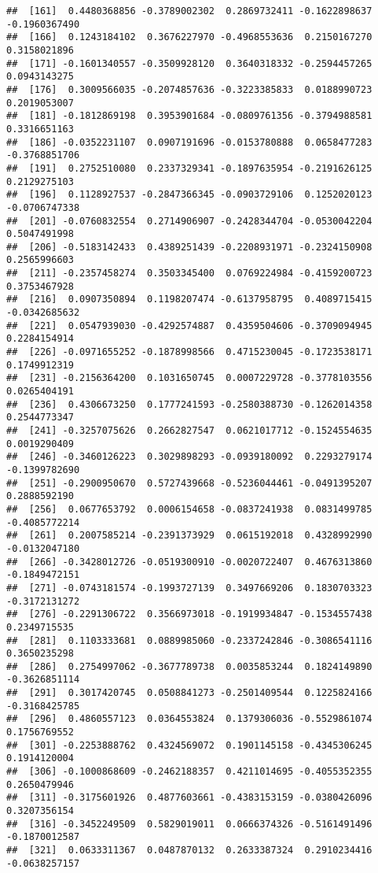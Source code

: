\documentclass[
]{article}
\begin{document}
\begin{verbatim}
##  [161]  0.4480368856 -0.3789002302  0.2869732411 -0.1622898637 -0.1960367490
##  [166]  0.1243184102  0.3676227970 -0.4968553636  0.2150167270  0.3158021896
##  [171] -0.1601340557 -0.3509928120  0.3640318332 -0.2594457265  0.0943143275
##  [176]  0.3009566035 -0.2074857636 -0.3223385833  0.0188990723  0.2019053007
##  [181] -0.1812869198  0.3953901684 -0.0809761356 -0.3794988581  0.3316651163
##  [186] -0.0352231107  0.0907191696 -0.0153780888  0.0658477283 -0.3768851706
##  [191]  0.2752510080  0.2337329341 -0.1897635954 -0.2191626125  0.2129275103
##  [196]  0.1128927537 -0.2847366345 -0.0903729106  0.1252020123 -0.0706747338
##  [201] -0.0760832554  0.2714906907 -0.2428344704 -0.0530042204  0.5047491998
##  [206] -0.5183142433  0.4389251439 -0.2208931971 -0.2324150908  0.2565996603
##  [211] -0.2357458274  0.3503345400  0.0769224984 -0.4159200723  0.3753467928
##  [216]  0.0907350894  0.1198207474 -0.6137958795  0.4089715415 -0.0342685632
##  [221]  0.0547939030 -0.4292574887  0.4359504606 -0.3709094945  0.2284154914
##  [226] -0.0971655252 -0.1878998566  0.4715230045 -0.1723538171  0.1749912319
##  [231] -0.2156364200  0.1031650745  0.0007229728 -0.3778103556  0.0265404191
##  [236]  0.4306673250  0.1777241593 -0.2580388730 -0.1262014358  0.2544773347
##  [241] -0.3257075626  0.2662827547  0.0621017712 -0.1524554635  0.0019290409
##  [246] -0.3460126223  0.3029898293 -0.0939180092  0.2293279174 -0.1399782690
##  [251] -0.2900950670  0.5727439668 -0.5236044461 -0.0491395207  0.2888592190
##  [256]  0.0677653792  0.0006154658 -0.0837241938  0.0831499785 -0.4085772214
##  [261]  0.2007585214 -0.2391373929  0.0615192018  0.4328992990 -0.0132047180
##  [266] -0.3428012726 -0.0519300910 -0.0020722407  0.4676313860 -0.1849472151
##  [271] -0.0743181574 -0.1993727139  0.3497669206  0.1830703323 -0.3172131272
##  [276] -0.2291306722  0.3566973018 -0.1919934847 -0.1534557438  0.2349715535
##  [281]  0.1103333681  0.0889985060 -0.2337242846 -0.3086541116  0.3650235298
##  [286]  0.2754997062 -0.3677789738  0.0035853244  0.1824149890 -0.3626851114
##  [291]  0.3017420745  0.0508841273 -0.2501409544  0.1225824166 -0.3168425785
##  [296]  0.4860557123  0.0364553824  0.1379306036 -0.5529861074  0.1756769552
##  [301] -0.2253888762  0.4324569072  0.1901145158 -0.4345306245  0.1914120004
##  [306] -0.1000868609 -0.2462188357  0.4211014695 -0.4055352355  0.2650479946
##  [311] -0.3175601926  0.4877603661 -0.4383153159 -0.0380426096  0.3207356154
##  [316] -0.3452249509  0.5829019011  0.0666374326 -0.5161491496 -0.1870012587
##  [321]  0.0633311367  0.0487870132  0.2633387324  0.2910234416 -0.0638257157

\end{verbatim}
\end{document}
